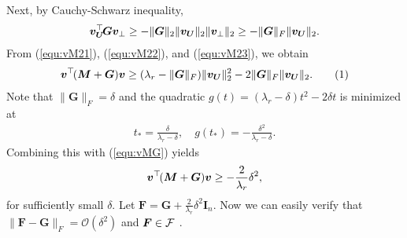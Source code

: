 \documentclass{article}
\def\F{{\cal F}}
\newcommand{\norm}[1]{\|#1\|} %
\newcommand\numberthis{\addtocounter{equation}{1}\tag{\theequation}}
\newcommand{\topnew}{\top \hspace{-0.05cm}}
\begin{document}
Next, by Cauchy-Schwarz inequality, 
\begin{align} \label{equ:vM23}
    \bm v_{\bm U}^\topnew \bm G \bm v_{\perp} \geq - \norm{\bm G}_2 \norm{\bm v_{\bm U}}_2 \norm{\bm v_{\perp}}_2 \geq - \norm{\bm G}_F \norm{\bm v_{\bm U}}_2 .
\end{align}
From (\ref{equ:vM21}), (\ref{equ:vM22}), and (\ref{equ:vM23}), we obtain
\begin{align*}
    \bm v^\topnew (\bm M + \bm G) \bm v \geq (\lambda_r - \norm{\bm G}_F) \norm{\bm v_{\bm U}}_2^2 - 2 \norm{\bm G}_F \norm{\bm v_{\bm U}}_2 . \numberthis \label{equ:vMG}
\end{align*}
Note that $\norm{\bm G}_F = \delta$ and the quadratic $g(t) = (\lambda_r - \delta) t^2 - 2 \delta t$ is minimized at 
\begin{align*}
    t_* = \frac{\delta}{\lambda_r - \delta} , \quad g(t_*) = -\frac{\delta^2}{\lambda_r - \delta} .
\end{align*}
Combining this with (\ref{equ:vMG}) yields
\begin{align*}
    \bm v^\topnew (\bm M + \bm G) \bm v \geq -\frac{2}{\lambda_r} \delta^2 ,
\end{align*}
for sufficiently small $\delta$.
Let $\bm F = \bm G + \frac{2}{\lambda_r} \delta^2 \bm I_{n}$. Now we can easily verify that $\norm{\bm F - \bm G}_F = \mathcal{O}(\delta^2)$ and $\bm F \in \F$ .
\end{document}
